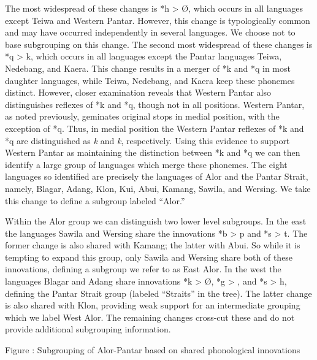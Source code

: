 The most widespread of these changes is *h {\textgreater} {\O}, which occurs in all languages except Teiwa and Western Pantar. However, this change is typologically common and may have occurred independently in several languages. We choose not to base subgrouping on this change. The second most widespread of these changes is *q {\textgreater} k, which occurs in all languages except the Pantar languages Teiwa, Nedebang, and Kaera. This change results in a merger of *k and *q in most daughter languages, while Teiwa, Nedebang, and Kaera keep these phonemes distinct. However, closer examination reveals that Western Pantar also distinguishes reflexes of *k and *q, though not in all positions. Western Pantar, as noted previously, geminates original stops in medial position, with the exception of *q. Thus, in medial position the Western Pantar reflexes of *k and *q are distinguished as \textit{k{\textlengthmark}} and \textit{k}, respectively. Using this evidence to support Western Pantar as maintaining the 
distinction between *k and *q we can then identify a large group of languages which merge these phonemes. The eight languages so identified are precisely the languages of Alor and the Pantar Strait, namely, Blagar, Adang, Klon, Kui, Abui, Kamang, Sawila, and Wersing. We take this change to define a subgroup labeled {\textquotedblleft}Alor.{\textquotedblright}

Within the Alor group we can distinguish two lower level subgroups. In the east the languages Sawila and Wersing share the innovations *b {\textgreater} p and *s {\textgreater} t. The former change is also shared with Kamang; the latter with Abui. So while it is tempting to expand this group, only Sawila and Wersing share both of these innovations, defining a subgroup we refer to as East Alor. In the west the languages Blagar and Adang share innovations *k {\textgreater} {\O}, *g {\textgreater} {\textglotstop}, and *s {\textgreater} h, defining the Pantar Strait group (labeled {\textquotedblleft}Straits{\textquotedblright} in the tree). The latter change is also shared with Klon, providing weak support for an intermediate grouping which we label West Alor. The remaining changes cross-cut these and do not provide additional subgrouping information. 

{\centering
\label{bkm:Ref214279128}Figure : Subgrouping of Alor-Pantar based on shared phonological innovations
\par}

{%
 \par}

